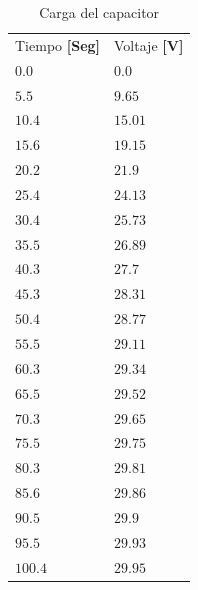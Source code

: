 \documentclass[twocolumn, 12pt]{article}
\begin{document}
\begin{table}[H]
    \centering
    \begin{tabularx}{0.9\linewidth}{|>{\centering\arraybackslash}X|>{\centering\arraybackslash}X|}

        \hline
        \multicolumn{2}{|c|}{Carga}                  \\\hline
        Tiempo \textbf{[Seg]} & Voltaje \textbf{[V]} \\\hline
        $0.0$                 & $0.0$                \\\hline
        $5.5$                 & $9.65$               \\\hline
        $10.4$                & $15.01$              \\\hline
        $15.6$                & $19.15$              \\\hline
        $20.2$                & $21.9$               \\\hline
        $25.4$                & $24.13$              \\\hline
        $30.4$                & $25.73$              \\\hline
        $35.5$                & $26.89$              \\\hline
        $40.3$                & $27.7$               \\\hline
        $45.3$                & $28.31$              \\\hline
        $50.4$                & $28.77$              \\\hline
        $55.5$                & $29.11$              \\\hline
        $60.3$                & $29.34$              \\\hline
        $65.5$                & $29.52$              \\\hline
        $70.3$                & $29.65$              \\\hline
        $75.5$                & $29.75$              \\\hline
        $80.3$                & $29.81$              \\\hline
        $85.6$                & $29.86$              \\\hline
        $90.5$                & $29.9$               \\\hline
        $95.5$                & $29.93$              \\\hline
        $100.4$               & $29.95$              \\\hline
    \end{tabularx}

    \caption{Carga del capacitor}
    \label{tab:datos__Carga}
\end{table}
\end{document}
